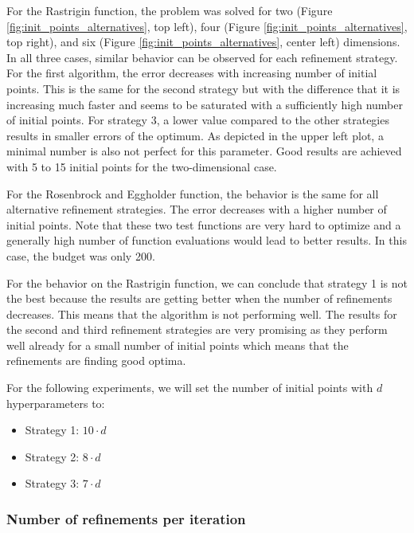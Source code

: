 For the Rastrigin function, the problem was solved for two (Figure \ref{fig:init_points_alternatives}, top left), four (Figure \ref{fig:init_points_alternatives}, top right), and six  (Figure \ref{fig:init_points_alternatives}, center left) dimensions. In all three cases, similar behavior can be observed for each refinement strategy. For the first algorithm, the error decreases with increasing number of initial points. This is the same for the second strategy but with the difference that it is increasing much faster and seems to be saturated with a sufficiently high number of initial points. For strategy 3, a lower value compared to the other strategies results in smaller errors of the optimum. As depicted in the upper left plot, a minimal number is also not perfect for this parameter. Good results are achieved with 5 to 15 initial points for the two-dimensional case. 

For the Rosenbrock and Eggholder function, the behavior is the same for all alternative refinement strategies. The error decreases with a higher number of initial points. Note that these two test functions are very hard to optimize and a generally high number of function evaluations would lead to better results. In this case, the budget was only 200. \newline 

For the behavior on the Rastrigin function, we can conclude that strategy 1 is not the best because the results are getting better when the number of refinements decreases. This means that the algorithm is not performing well. The results for the second and third refinement strategies are very promising as they perform well already for a small number of initial points which means that the refinements are finding good optima. \newline 

For the following experiments, we will set the number of initial points with $ d $ hyperparameters to:

\begin{itemize}
	\item Strategy 1: $ 10 \cdot d $
	\item Strategy 2: $ 8 \cdot d $
	\item Strategy 3: $ 7 \cdot d $
\end{itemize}



\subsubsection{Number of refinements per iteration}

